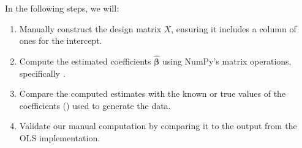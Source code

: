\documentclass[letterpaper,10pt,english]{jupyterBook}
\begin{document}
\sphinxAtStartPar
In the following steps, we will:
\begin{enumerate}
%
\item {} 
\sphinxAtStartPar
Manually construct the design matrix \(X\), ensuring it includes a column of ones for the intercept.

\item {} 
\sphinxAtStartPar
Compute the estimated coefficients \(\hat{\boldsymbol{\beta}}\) using NumPy’s matrix operations, specifically .

\item {} 
\sphinxAtStartPar
Compare the computed estimates with the known or true values of the coefficients () used to generate the data.

\item {} 
\sphinxAtStartPar
Validate our manual computation by comparing it to the output from the  OLS implementation.

\end{enumerate}
\end{document}
